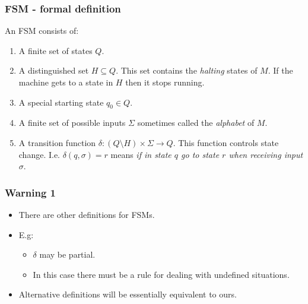 \documentclass[handout]{beamer}
\begin{document}
\begin{frame}
\frametitle{FSM - formal definition}
An FSM consists of:
\begin{enumerate}
\item A finite set of states $Q$.
\item A distinguished set $H\subseteq Q$. This set contains the \emph{halting} states of $M$. If the machine gets to a state in $H$ then it stops running. 
\item A special starting state $q_0\in Q$.
\item A finite set of possible inputs $\Sigma$ sometimes called the \emph{alphabet} of $M$.
\item A transition function $\delta:(Q\setminus H)\times \Sigma\to Q$. This function controls state change. I.e. $\delta(q,\sigma)=r$ means \emph{if in state $q$ go to state $r$ when receiving input $\sigma$}.
\end{enumerate} 
\end{frame}

\begin{frame}
\frametitle{Warning 1}
\begin{itemize}
\item There are other definitions for FSMs.
\vspace{0.5cm}
\item E.g:
 \begin{itemize}
\item $\delta$ may be partial. 
\item In this case there must be a rule for dealing with undefined situations.
\end{itemize}
\vspace{0.5cm}
\item Alternative definitions will be essentially equivalent to ours.
\end{itemize}
\end{frame}
\end{document}
